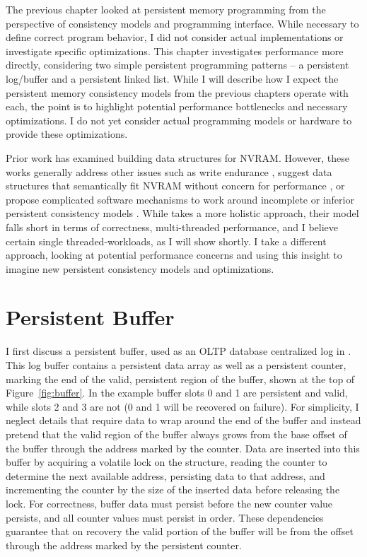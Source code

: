 The previous chapter looked at persistent memory programming from the perspective of consistency models and programming interface.
While necessary to define correct program behavior, I did not consider actual implementations or investigate specific optimizations.
This chapter investigates performance more directly, considering two simple persistent programming patterns -- a persistent log/buffer and a persistent linked list.
While I will describe how I expect the persistent memory consistency models from the previous chapters operate with each, the point is to highlight potential performance bottlenecks and necessary optimizations.
I do not yet consider actual programming models or hardware to provide these optimizations.

Prior work has examined building data structures for NVRAM.
However, these works generally address other issues such as write endurance \cite{ChenGibbons11}, suggest data structures that semantically fit NVRAM without concern for performance \cite{VenkataramanTolia11}, or propose complicated software mechanisms to work around incomplete or inferior persistent consistency models \cite{FangHsiao11}.
While \cite{ConditNightingale09} takes a more holistic approach, their model falls short in terms of correctness, multi-threaded performance, and I believe certain single threaded-workloads, as I will show shortly.
I take a different approach, looking at potential performance concerns and using this insight to imagine new persistent consistency models and optimizations.

\section{Persistent Buffer}
\label{sec:PMC_patterns:Buffer}





I first discuss a persistent buffer, used as an OLTP database centralized log in \cite{FangHsiao11}.
This log buffer contains a persistent data array as well as a persistent counter, marking the end of the valid, persistent region of the buffer, shown at the top of Figure~\ref{fig:buffer}.
In the example buffer slots 0 and 1 are persistent and valid, while slots 2 and 3 are not (0 and 1 will be recovered on failure).
For simplicity, I neglect details that require data to wrap around the end of the buffer and instead pretend that the valid region of the buffer always grows from the base offset of the buffer through the address marked by the counter.
Data are inserted into this buffer by acquiring a volatile lock on the structure, reading the counter to determine the next available address, persisting data to that address, and incrementing the counter by the size of the inserted data before releasing the lock.
For correctness, buffer data must persist before the new counter value persists, and all counter values must persist in order.
These dependencies guarantee that on recovery the valid portion of the buffer will be from the offset through the address marked by the persistent counter.

